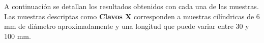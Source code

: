 \documentclass[a4paper,12pt,fleqn,twoside,openany]{book}
\begin{document}
 A continuación se detallan los resultados obtenidos con cada una de las muestras. Las muestras descriptas como \textbf{Clavos X} corresponden a muestras cilíndricas de $6$ mm de diámetro aproximadamente y una longitud que puede variar entre $30$ y $100$ mm.
 

 
%  
% 
%     
%  
\end{document}
